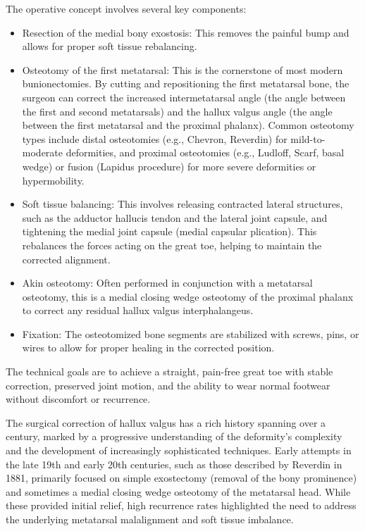 The operative concept involves several key components:
\begin{itemize}
  \item Resection of the medial bony exostosis: This removes the painful bump and allows for proper soft tissue rebalancing.
  \item Osteotomy of the first metatarsal: This is the cornerstone of most modern bunionectomies. By cutting and repositioning the first metatarsal bone, the surgeon can correct the increased intermetatarsal angle (the angle between the first and second metatarsals) and the hallux valgus angle (the angle between the first metatarsal and the proximal phalanx). Common osteotomy types include distal osteotomies (e.g., Chevron, Reverdin) for mild-to-moderate deformities, and proximal osteotomies (e.g., Ludloff, Scarf, basal wedge) or fusion (Lapidus procedure) for more severe deformities or hypermobility.
  \item Soft tissue balancing: This involves releasing contracted lateral structures, such as the adductor hallucis tendon and the lateral joint capsule, and tightening the medial joint capsule (medial capsular plication). This rebalances the forces acting on the great toe, helping to maintain the corrected alignment.
  \item Akin osteotomy: Often performed in conjunction with a metatarsal osteotomy, this is a medial closing wedge osteotomy of the proximal phalanx to correct any residual hallux valgus interphalangeus.
\item Fixation: The osteotomized bone segments are stabilized with screws, pins, or wires to allow for proper healing in the corrected position.
\end{itemize}
The technical goals are to achieve a straight, pain-free great toe with stable correction, preserved joint motion, and the ability to wear normal footwear without discomfort or recurrence.

The surgical correction of hallux valgus has a rich history spanning over a century, marked by a progressive understanding of the deformity's complexity and the development of increasingly sophisticated techniques. Early attempts in the late 19th and early 20th centuries, such as those described by Reverdin in 1881, primarily focused on simple exostectomy (removal of the bony prominence) and sometimes a medial closing wedge osteotomy of the metatarsal head. While these provided initial relief, high recurrence rates highlighted the need to address the underlying metatarsal malalignment and soft tissue imbalance.

